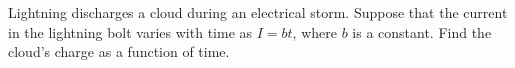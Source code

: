         Lightning discharges a cloud during an electrical storm. Suppose
        that the current in the lightning bolt varies with time as $I=bt$, where
         $b$ is a constant. Find the cloud's charge as a function of time.
        \answercheck

